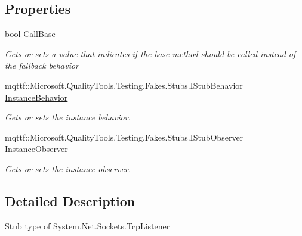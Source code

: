 \subsection*{Properties}
\begin{DoxyCompactItemize}
\item 
bool \hyperlink{class_system_1_1_net_1_1_sockets_1_1_fakes_1_1_stub_tcp_listener_aff1088fbce83d9eb1ac2393ec68237d2}{Call\-Base}
\begin{DoxyCompactList}\small\item\em Gets or sets a value that indicates if the base method should be called instead of the fallback behavior\end{DoxyCompactList}\item 
mqttf\-::\-Microsoft.\-Quality\-Tools.\-Testing.\-Fakes.\-Stubs.\-I\-Stub\-Behavior \hyperlink{class_system_1_1_net_1_1_sockets_1_1_fakes_1_1_stub_tcp_listener_a970d495846686ec71eb37c689fb4d44e}{Instance\-Behavior}
\begin{DoxyCompactList}\small\item\em Gets or sets the instance behavior.\end{DoxyCompactList}\item 
mqttf\-::\-Microsoft.\-Quality\-Tools.\-Testing.\-Fakes.\-Stubs.\-I\-Stub\-Observer \hyperlink{class_system_1_1_net_1_1_sockets_1_1_fakes_1_1_stub_tcp_listener_a48c24410dd8407d9a80d41d26f680035}{Instance\-Observer}
\begin{DoxyCompactList}\small\item\em Gets or sets the instance observer.\end{DoxyCompactList}\end{DoxyCompactItemize}


\subsection{Detailed Description}
Stub type of System.\-Net.\-Sockets.\-Tcp\-Listener



